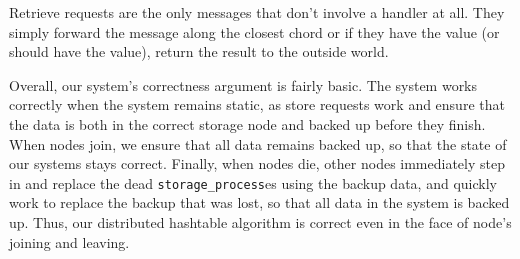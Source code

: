 \documentclass[12pt,letterpaper]{article}
\renewcommand{\tt}[1]{\texttt{#1}}
\renewcommand{\sp}{\tt{storage\_process}}
\begin{document}
Retrieve requests are the only messages that don't involve a handler at all. They simply forward the message along the closest chord or if they have the value (or should have the value), return the result to the outside world.

Overall, our system's correctness argument is fairly basic. The system works correctly when the system remains static, as store requests work and ensure that the data is both in the correct storage node and backed up before they finish. When nodes join, we ensure that all data remains backed up, so that the state of our systems stays correct. Finally, when nodes die, other nodes immediately step in and replace the dead \sp es using the backup data, and quickly work to replace the backup that was lost, so that all data in the system is backed up. Thus, our distributed hashtable algorithm is correct even in the face of node's joining and leaving.
\end{document}
